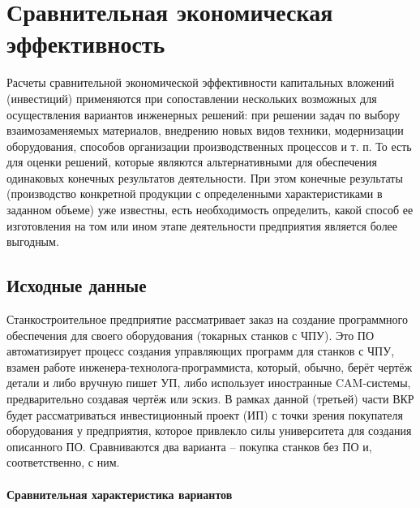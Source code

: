 
\pagebreak
\section{Сравнительная экономическая эффективность}

Расчеты сравнительной экономической эффективности капитальных вложений (инвестиций) применяются при сопоставлении нескольких возможных для осуществления вариантов инженерных решений: при решении задач по выбору взаимозаменяемых материалов, внедрению новых видов техники, модернизации оборудования, способов организации производственных процессов и т. п. То есть для оценки решений, которые являются альтернативными для обеспечения одинаковых конечных результатов деятельности. При этом конечные результаты (производство конкретной продукции с определенными характеристиками в заданном объеме) уже известны, есть необходимость определить, какой способ ее изготовления на том или ином этапе деятельности предприятия является более выгодным.

\subsection{Исходные данные}

Станкостроительное предприятие рассматривает заказ на создание программного обеспечения для своего оборудования (токарных станков с ЧПУ). Это ПО автоматизирует процесс создания управляющих программ для станков с ЧПУ, взамен работе инженера-технолога-программиста, который, обычно, берёт чертёж детали и либо вручную пишет УП, либо использует иностранные CAM-системы, предварительно создавая чертёж или эскиз.
В рамках данной (третьей) части ВКР будет рассматриваться инвестиционный проект (ИП) с точки зрения покупателя оборудования у предприятия, которое привлекло силы университета для создания описанного ПО. Сравниваются два варианта – покупка станков без ПО и, соответственно, с ним.

\paragraph{Сравнительная характеристика вариантов} 
\nopagebreak

